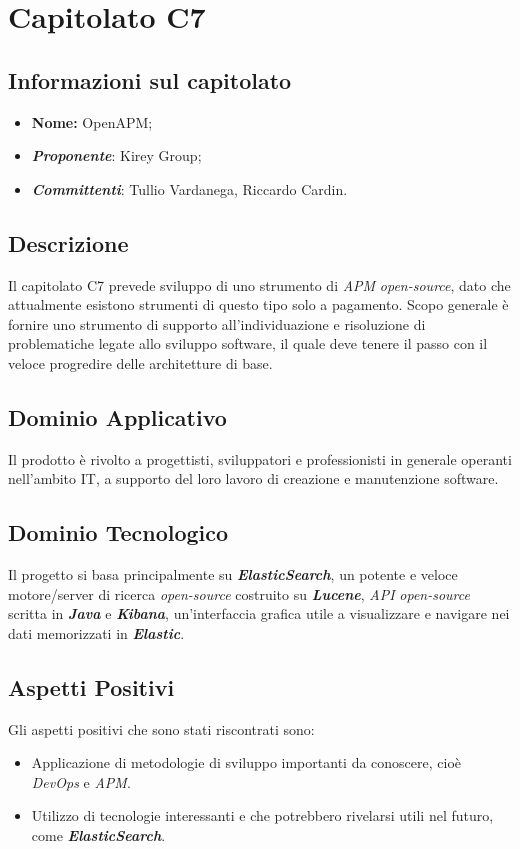\section{Capitolato C7}
\subsection{Informazioni sul capitolato}
	\begin{itemize}
		\item \textbf{Nome:}
		OpenAPM;
		\item \textbf{\textit{Proponente}}:
		Kirey Group;
		\item \textbf{\textit{Committenti}}:
		Tullio Vardanega, Riccardo Cardin.
	\end{itemize}

\subsection{Descrizione}
	Il capitolato C7 prevede sviluppo di uno strumento di \textit{APM} \textit{open-source}, dato che attualmente esistono strumenti di questo tipo solo a pagamento. Scopo generale è fornire uno strumento di supporto all'individuazione e risoluzione di problematiche legate allo sviluppo software, il quale deve tenere il passo con il veloce progredire delle architetture di base.
		
\subsection{Dominio Applicativo}
	Il prodotto è rivolto a progettisti, sviluppatori e professionisti in generale operanti nell'ambito IT, a supporto del loro lavoro di creazione e manutenzione software. 

\subsection{Dominio Tecnologico}
	Il progetto si basa principalmente su \textit{\textbf{ElasticSearch}}, un potente e veloce motore/server di ricerca \textit{open-source} costruito su \textit{\textbf{Lucene}}, \textit{API} \textit{open-source} scritta in \textit{\textbf{Java}}  e \textit{\textbf{Kibana}}, un'interfaccia grafica utile a visualizzare e navigare nei dati memorizzati in \textit{\textbf{Elastic}}.

\subsection{Aspetti Positivi}
	Gli aspetti positivi che sono stati riscontrati sono:
	\begin{itemize}
	\item Applicazione di metodologie di sviluppo importanti da conoscere, cioè \textit{DevOps} e \textit{APM}.
	\item Utilizzo di tecnologie interessanti e che potrebbero rivelarsi utili nel futuro, come \textit{\textbf{ElasticSearch}}.
	\end{itemize}

